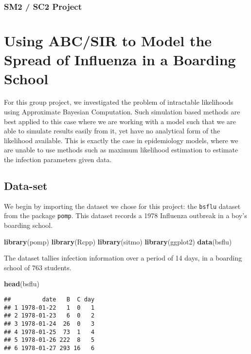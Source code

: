 \documentclass[
]{article}
\author{}
\date{\vspace{-2.5em}}
\newenvironment{Shaded}{\begin{snugshade}}{\end{snugshade}}
\newcommand{\FunctionTok}[1]{\textcolor[rgb]{0.13,0.29,0.53}{\textbf{#1}}}
\newcommand{\NormalTok}[1]{#1}
\begin{document}
\subsubsection{SM2 / SC2 Project}\label{sm2-sc2-project}

\section{Using ABC/SIR to Model the Spread of Influenza in a Boarding
School}\label{using-abcsir-to-model-the-spread-of-influenza-in-a-boarding-school}

For this group project, we investigated the problem of intractable
likelihoods using Approximate Bayesian Computation. Such simulation
based methods are best applied to this case where we are working with a
model such that we are able to simulate results easily from it, yet have
no analytical form of the likelihood available. This is exactly the case
in epidemiology models, where we are unable to use methods such as
maximum likelihood estimation to estimate the infection parameters given
data.

\subsection{Data-set}\label{data-set}

We begin by importing the dataset we chose for this project: the
\texttt{bsflu} dataset from the package \texttt{pomp}. This dataset
records a 1978 Influenza outbreak in a boy's boarding school.

\begin{Shaded}
\begin{Highlighting}[]
\FunctionTok{library}\NormalTok{(pomp)}
\FunctionTok{library}\NormalTok{(Rcpp)}
\FunctionTok{library}\NormalTok{(sitmo)}
\FunctionTok{library}\NormalTok{(ggplot2)}
\FunctionTok{data}\NormalTok{(bsflu)}
\end{Highlighting}
\end{Shaded}

The dataset tallies infection information over a period of 14 days, in a
boarding school of 763 students.

\begin{Shaded}
\begin{Highlighting}[]
\FunctionTok{head}\NormalTok{(bsflu)}
\end{Highlighting}
\end{Shaded}

\begin{verbatim}
##         date   B  C day
## 1 1978-01-22   1  0   1
## 2 1978-01-23   6  0   2
## 3 1978-01-24  26  0   3
## 4 1978-01-25  73  1   4
## 5 1978-01-26 222  8   5
## 6 1978-01-27 293 16   6
\end{verbatim}
\end{document}

